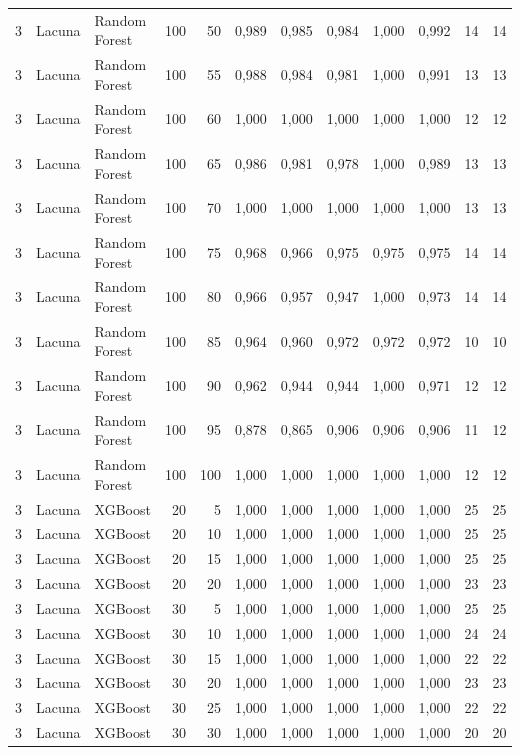 \begin{longtable}{@{}rllrrrrrrrrr@{}}
3 & Lacuna & Random Forest & 100 & 50 & 0,989 & 0,985 & 0,984 & 1,000 & 0,992 & 14 & 14 \\
3 & Lacuna & Random Forest & 100 & 55 & 0,988 & 0,984 & 0,981 & 1,000 & 0,991 & 13 & 13 \\
3 & Lacuna & Random Forest & 100 & 60 & 1,000 & 1,000 & 1,000 & 1,000 & 1,000 & 12 & 12 \\
3 & Lacuna & Random Forest & 100 & 65 & 0,986 & 0,981 & 0,978 & 1,000 & 0,989 & 13 & 13 \\
3 & Lacuna & Random Forest & 100 & 70 & 1,000 & 1,000 & 1,000 & 1,000 & 1,000 & 13 & 13 \\
3 & Lacuna & Random Forest & 100 & 75 & 0,968 & 0,966 & 0,975 & 0,975 & 0,975 & 14 & 14 \\
3 & Lacuna & Random Forest & 100 & 80 & 0,966 & 0,957 & 0,947 & 1,000 & 0,973 & 14 & 14 \\
3 & Lacuna & Random Forest & 100 & 85 & 0,964 & 0,960 & 0,972 & 0,972 & 0,972 & 10 & 10 \\
3 & Lacuna & Random Forest & 100 & 90 & 0,962 & 0,944 & 0,944 & 1,000 & 0,971 & 12 & 12 \\
3 & Lacuna & Random Forest & 100 & 95 & 0,878 & 0,865 & 0,906 & 0,906 & 0,906 & 11 & 12 \\
3 & Lacuna & Random Forest & 100 & 100 & 1,000 & 1,000 & 1,000 & 1,000 & 1,000 & 12 & 12 \\
3 & Lacuna & XGBoost & 20 & 5 & 1,000 & 1,000 & 1,000 & 1,000 & 1,000 & 25 & 25 \\
3 & Lacuna & XGBoost & 20 & 10 & 1,000 & 1,000 & 1,000 & 1,000 & 1,000 & 25 & 25 \\
3 & Lacuna & XGBoost & 20 & 15 & 1,000 & 1,000 & 1,000 & 1,000 & 1,000 & 25 & 25 \\
3 & Lacuna & XGBoost & 20 & 20 & 1,000 & 1,000 & 1,000 & 1,000 & 1,000 & 23 & 23 \\
3 & Lacuna & XGBoost & 30 & 5 & 1,000 & 1,000 & 1,000 & 1,000 & 1,000 & 25 & 25 \\
3 & Lacuna & XGBoost & 30 & 10 & 1,000 & 1,000 & 1,000 & 1,000 & 1,000 & 24 & 24 \\
3 & Lacuna & XGBoost & 30 & 15 & 1,000 & 1,000 & 1,000 & 1,000 & 1,000 & 22 & 22 \\
3 & Lacuna & XGBoost & 30 & 20 & 1,000 & 1,000 & 1,000 & 1,000 & 1,000 & 23 & 23 \\
3 & Lacuna & XGBoost & 30 & 25 & 1,000 & 1,000 & 1,000 & 1,000 & 1,000 & 22 & 22 \\
3 & Lacuna & XGBoost & 30 & 30 & 1,000 & 1,000 & 1,000 & 1,000 & 1,000 & 20 & 20 \\

\end{longtable}
